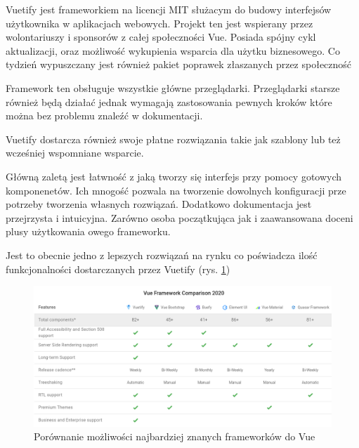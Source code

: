 Vuetify jest frameworkiem na licencji MIT  służacym do budowy interfejsów użytkownika w aplikacjach webowych. Projekt ten jest wspierany przez wolontariuszy i sponsorów z całej społeczności Vue. Posiada spójny cykl aktualizacji, oraz możliwość wykupienia wsparcia dla użytku biznesowego. Co tydzień wypuszczany jest również pakiet poprawek złaszanych przez społeczność

Framework ten obsługuje wszystkie główne przeglądarki. Przeglądarki starsze również będą działać jednak wymagają zastosowania pewnych kroków które można bez problemu znaleźć w dokumentacji.

Vuetify dostarcza również swoje płatne rozwiązania takie jak szablony lub też wcześniej wspomniane wsparcie.

Główną zaletą jest łatwność z jaką tworzy się interfejs przy pomocy gotowych komponenetów. Ich mnogość pozwala na tworzenie dowolnych konfiguracji prze potrzeby tworzenia własnych rozwiązań. Dodatkowo dokumentacja jest przejrzysta i intuicyjna. Zarówno osoba początkująca jak i zaawansowana doceni plusy użytkowania owego frameworku.

Jest to obecnie jedno z lepszych rozwiązań na rynku co poświadcza ilość funkcjonalności dostarczanych przez Vuetify (rys. \ref{fig:vuetifyjs})

\begin{figure}[!ht]
    \centering
    \includegraphics[width=6in]{images/vuetifyjs.png}
    \caption{Porównanie możliwości najbardziej znanych frameworków do Vue \label{fig:vuetifyjs}}
\end{figure}